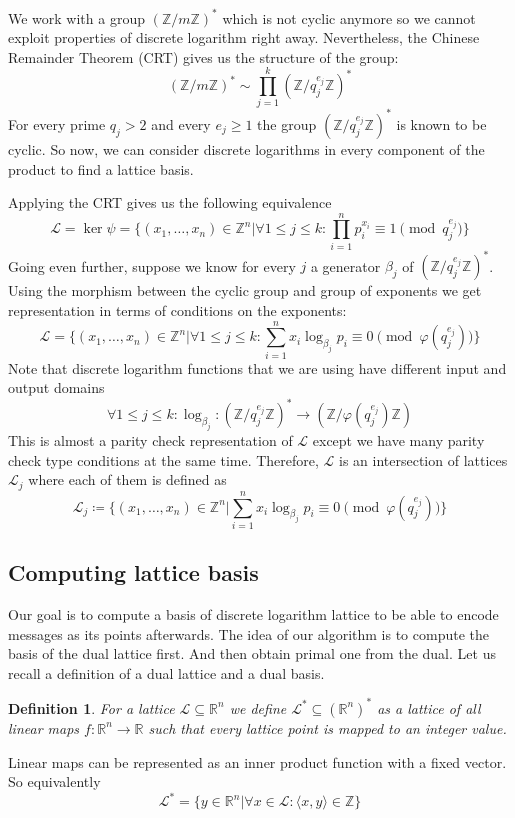 \documentclass[12pt]{article}
\newcommand{\ZZ}{\mathbb{Z}}
\newcommand{\LL}{\mathcal{L}}
\newtheorem{definition}{Definition}
\begin{document}
We work with a group $(\ZZ/m\ZZ)^*$ which is not cyclic anymore so we cannot exploit properties of discrete logarithm right away. Nevertheless, the Chinese Remainder Theorem (CRT) gives us the structure of the group:
\[
   (\ZZ/m\ZZ)^* \sim \prod_{j=1}^{k}(\ZZ/q_{j}^{e_{j}}\ZZ)^*
\]
For every prime $q_{j} > 2$ and every $e_{j} \geq 1$ the group $(\ZZ/q_{j}^{e_{j}}\ZZ)^*$ is known to be cyclic. So now, we can consider discrete logarithms in every component of the product to find a lattice basis.

Applying the CRT gives us the following equivalence
\[
    \LL = \ker \psi = \{(x_{1}, \dots, x_{n}) \in \ZZ^{n} |  \forall 1 \leq j \leq k: \prod_{i=1}^{n}p_{i}^{x_{i}} \equiv 1 \pmod{q_{j}^{e_{j}}}\}
\]
Going even further, suppose we know for every $j$ a generator ${\beta_{j}}$ of  $(\ZZ/q_{j}^{e_{j}}\ZZ)^*$. Using the morphism between the cyclic group and group of exponents we get representation in terms of conditions on the exponents:
\[
    \LL = \{(x_{1}, \dots, x_{n}) \in \ZZ^{n} |  \forall 1 \leq j \leq k: \sum_{i=1}^{n}x_{i}\log_{\beta_{j}}p_{i}\equiv 0 \pmod{\varphi(q_{j}^{e_{j}})}\}
\]
Note that discrete logarithm functions that we are using have different input and output domains
\[
    \forall 1 \leq j \leq k: \log_{\beta_{j}}: (\ZZ/q_{j}^{e_{j}}\ZZ)^* \rightarrow (\ZZ/\varphi(q_{j}^{e_{j}})\ZZ)
\]
This is almost a parity check representation of $\LL$ except we have many parity check type conditions at the same time. Therefore, $\LL$ is an intersection of lattices $\LL_{j}$ where each of them is defined as
\[
\label{parity check}
    \LL_{j} \coloneqq \{(x_{1}, \dots, x_{n}) \in \ZZ^{n} | \sum_{i=1}^{n}x_{i}\log_{\beta_{j}}p_{i}\equiv 0 \pmod{\varphi(q_{j}^{e_{j}})}\}
\]


\subsection{Computing lattice basis}
\label{subsec:compute_basis_integers}


Our goal is to compute a basis of discrete logarithm lattice to be able to encode messages as its points afterwards. The idea of our algorithm is to compute the basis of the dual lattice first. And then obtain primal one from the dual.
Let us recall a definition of a dual lattice and a dual basis.
\begin{definition}
    For a lattice $\LL \subseteq \mathbb{R}^{n}$ we define $\LL^{*} \subseteq (\mathbb{R}^{n})^{*}$ as a lattice of all linear maps $f:\mathbb{R}^{n} \rightarrow \mathbb{R}$ such that every lattice point is mapped to an integer value.
\end{definition}
Linear maps can be represented as an inner product function with a fixed vector. So equivalently
\[
    \LL^{*} = \{y \in \mathbb{R}^{n} | \forall x \in \LL:  \langle x,y\rangle \in \ZZ \}
\]
\end{document}
